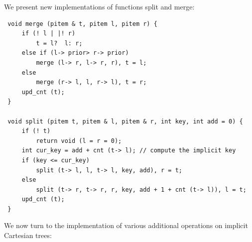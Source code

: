 We present new implementations of functions split and merge:

\begin{verbatim}
 void merge (pitem & t, pitem l, pitem r) {
     if (! l | |! r)
         t = l?  l: r;
     else if (l-> prior> r-> prior)
         merge (l-> r, l-> r, r), t = l;
     else
         merge (r-> l, l, r-> l), t = r;
     upd_cnt (t);
 }

 void split (pitem t, pitem & l, pitem & r, int key, int add = 0) {
     if (! t)
         return void (l = r = 0);
     int cur_key = add + cnt (t-> l); // compute the implicit key
     if (key <= cur_key)
         split (t-> l, l, t-> l, key, add), r = t;
     else
         split (t-> r, t-> r, r, key, add + 1 + cnt (t-> l)), l = t;
     upd_cnt (t);
 } 
\end{verbatim}
We now turn to the implementation of various additional operations on implicit Cartesian trees:

